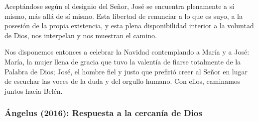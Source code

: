 \begin{body}
					Aceptándose según el designio del Señor, José se encuentra plenamente a sí mismo, más allá de sí mismo. Esta libertad de renunciar a lo que es suyo, a la posesión de la propia existencia, y esta plena disponibilidad interior a la voluntad de Dios, nos interpelan y nos muestran el camino.
					
					Nos disponemos entonces a celebrar la Navidad contemplando a María y a José: María, la mujer llena de gracia que tuvo la valentía de fiarse totalmente de la Palabra de Dios; José, el hombre fiel y justo que prefirió creer al Señor en lugar de escuchar las voces de la duda y del orgullo humano. Con ellos, caminamos juntos hacia Belén.
				\end{body}
			

			\subsubsection{Ángelus (2016): Respuesta a la cercanía de Dios}
			
				
